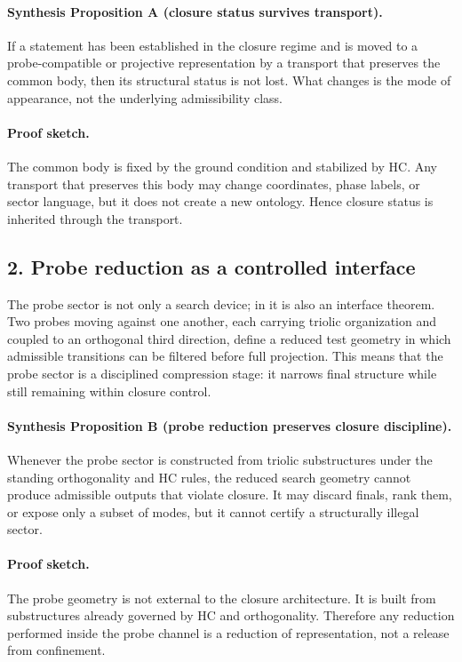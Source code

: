 \paragraph{Synthesis Proposition A (closure status survives transport).}
If a statement has been established in the closure regime and is moved to a
probe-compatible or projective representation by a transport that preserves the
common body, then its structural status is not lost. What changes is the mode of
appearance, not the underlying admissibility class.

\paragraph{Proof sketch.}
The common body is fixed by the ground condition and stabilized by HC. Any
transport that preserves this body may change coordinates, phase labels, or
sector language, but it does not create a new ontology. Hence closure status is
inherited through the transport.

\subsection*{2. Probe reduction as a controlled interface}
The probe sector is not only a search device; in  it is also an
interface theorem. Two probes moving against one another, each carrying triolic
organization and coupled to an orthogonal third direction, define a reduced test
geometry in which admissible transitions can be filtered before full projection.
This means that the probe sector is a disciplined compression stage: it narrows
final structure while still remaining within closure control.

\paragraph{Synthesis Proposition B (probe reduction preserves closure discipline).}
Whenever the probe sector is constructed from triolic substructures under the
standing orthogonality and HC rules, the reduced search geometry cannot produce
admissible outputs that violate closure. It may discard finals, rank them,
or expose only a subset of modes, but it cannot certify a structurally illegal
sector.

\paragraph{Proof sketch.}
The probe geometry is not external to the closure architecture. It is built from
substructures already governed by HC and orthogonality. Therefore any reduction
performed inside the probe channel is a reduction of representation, not a
release from confinement.

